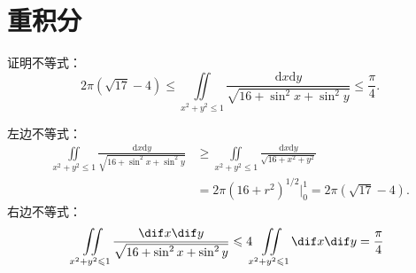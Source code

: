 \documentclass[color=green,titlestyle=hang]{elegantbook}%
\begin{document}


\chapter{重积分} %

\begin{example}
证明不等式：
\[2\pi\left(\sqrt{17}-4\right)\le \iint\limits_{x^2+y^2\le 1}\frac{\text{d}x\text{d}y}{\sqrt{16+\sin^2x+\sin^2y}}\le \frac{\pi}{4}.\]	
\end{example}
\begin{solution}
左边不等式：\begin{align*}
\iint\limits_{{{x}^2}+{{y}^2}\leqslant 1}{\frac{\text{d}x\text{d}y}{\sqrt{16+{{\sin }^2}x+{{\sin }^2}y}}}&\geqslant \iint\limits_{{{x}^2}+{{y}^2}\leqslant 1}{\frac{\text{d}x\text{d}y}{\sqrt{16+x^2+y^2}}}\\
&=2\pi (16+r^2)^{1/2}\Big|_0^1= 2\pi \left( \sqrt{17}-4 \right).
\end{align*}
右边不等式：\[\iint\limits_{x^2+y^2\leqslant1}\frac{\dif x\dif y}{\sqrt{16+\sin^2x+\sin^2y}}\leqslant4\iint\limits_{x^2+y^2\leqslant1}\dif x\dif y=\frac{\pi}{4}\]
\end{solution}
\end{document}
